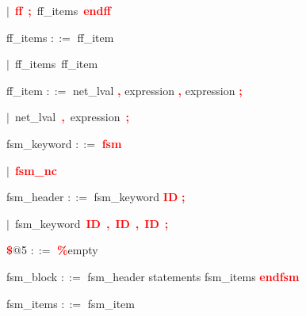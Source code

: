 \mbox{$|$ \textbf{\textcolor{red}{ff}} \textbf{\textcolor{red}{;}} ff\_items \textbf{\textcolor{red}{endff}}}

\vspace{1em}
\noindent
\settowidth{\parindent}{\hspace{4ex}}
ff\_items $::=$\hspace{1ex} ff\_item

\mbox{$|$ ff\_items ff\_item}

\vspace{1em}
\noindent
\settowidth{\parindent}{\hspace{4ex}}
ff\_item $::=$\hspace{1ex} net\_lval \textbf{\textcolor{red}{,}} expression \textbf{\textcolor{red}{,}} expression \textbf{\textcolor{red}{;}}

\mbox{$|$ net\_lval \textbf{\textcolor{red}{,}} expression \textbf{\textcolor{red}{;}}}

\vspace{1em}
\noindent
\settowidth{\parindent}{\hspace{4ex}}
fsm\_keyword $::=$\hspace{1ex} \textbf{\textcolor{red}{fsm}}

\mbox{$|$ \textbf{\textcolor{red}{fsm\_nc}}}

\vspace{1em}
\noindent
\settowidth{\parindent}{\hspace{4ex}}
fsm\_header $::=$\hspace{1ex} fsm\_keyword \textbf{\textcolor{red}{ID}} \textbf{\textcolor{red}{;}}

\mbox{$|$ fsm\_keyword \textbf{\textcolor{red}{ID}} \textbf{\textcolor{red}{,}} \textbf{\textcolor{red}{ID}} \textbf{\textcolor{red}{,}} \textbf{\textcolor{red}{ID}} \textbf{\textcolor{red}{;}}}

\vspace{1em}
\noindent
\settowidth{\parindent}{\hspace{4ex}}
\textbf{\textcolor{red}{\$}}@5 $::=$\hspace{1ex} \textbf{\textcolor{red}{\%}}empty

\vspace{1em}
\noindent
\settowidth{\parindent}{\hspace{4ex}}
fsm\_block $::=$\hspace{1ex} fsm\_header statements fsm\_items \textbf{\textcolor{red}{endfsm}}

\vspace{1em}
\noindent
\settowidth{\parindent}{\hspace{4ex}}
fsm\_items $::=$\hspace{1ex} fsm\_item

